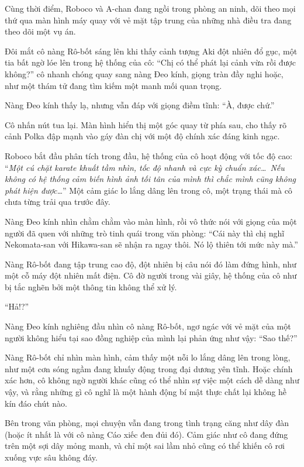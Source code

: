 \documentclass[../main.tex]{subfiles}
\begin{document}
\ct

Cùng thời điểm, Roboco và A-chan đang ngồi trong phòng an ninh, dõi theo mọi thứ qua màn hình máy quay với vẻ mặt tập trung của những nhà điều tra đang theo dõi một vụ án.


Đôi mắt cô nàng Rô-bốt sáng lên khi thấy cảnh tượng Aki đột nhiên đổ gục, một tia bất ngờ lóe lên trong hệ thống của cô: ``Chị có thể phát lại cảnh vừa rồi được không?'' cô nhanh chóng quay sang nàng Đeo kính, giọng tràn đầy nghi hoặc, như một thám tử đang tìm kiếm một manh mối quan trọng.

Nàng Đeo kính thấy lạ, nhưng vẫn đáp với giọng điềm tĩnh: ``À, được chứ.''

Cô nhấn nút tua lại. Màn hình hiển thị một góc quay từ phía sau, cho thấy rõ cảnh Polka đập mạnh vào gáy đàn chị với một độ chính xác đáng kinh ngạc.

Roboco bắt đầu phân tích trong đầu, hệ thống của cô hoạt động với tốc độ cao: ``\textit{Một cú chặt karate khuất tầm nhìn, tốc độ nhanh và cực kỳ chuẩn xác\dots\ Nếu không có hệ thống cảm biến hình ảnh tối tân của mình thì chắc mình cũng không phát hiện được\dots}'' Một cảm giác lo lắng dâng lên trong cô, một trạng thái mà cô chưa từng trải qua trước đây.

Nàng Đeo kính nhìn chằm chằm vào màn hình, rồi vô thức nói với giọng của một người đã quen với những trò tinh quái trong văn phòng: ``Cái này thì chị nghĩ Nekomata-san với Hikawa-san sẽ nhận ra ngay thôi. Nó lộ thiên tới mức này mà.''

Nàng Rô-bốt đang tập trung cao độ, đột nhiên bị câu nói đó làm đứng hình, như một cỗ máy đột nhiên mất điện. Cô đờ người trong vài giây, hệ thống của cô như bị tắc nghẽn bởi một thông tin không thể xử lý.

``Hả!?''

Nàng Đeo kính nghiêng đầu nhìn cô nàng Rô-bốt, ngơ ngác với vẻ mặt của một người không hiểu tại sao đồng nghiệp của mình lại phản ứng như vậy: ``Sao thế?''

Nàng Rô-bốt chỉ nhìn màn hình, cảm thấy một nỗi lo lắng dâng lên trong lòng, như một cơn sóng ngầm đang khuấy động trong đại dương yên tĩnh. Hoặc chính xác hơn, cô không ngờ người khác cũng có thể nhìn sự việc một cách dễ dàng như vậy, và rằng những gì cô nghĩ là một hành động bí mật thực chất lại không hề kín đáo chút nào.

\ct

Bên trong văn phòng, mọi chuyện vẫn đang trong tình trạng căng như dây đàn (hoặc ít nhất là với cô nàng Cáo xiếc đen đủi đó). Cảm giác như cô đang đứng trên một sợi dây mỏng manh, và chỉ một sai lầm nhỏ cũng có thể khiến cô rơi xuống vực sâu không đáy.
\end{document}
